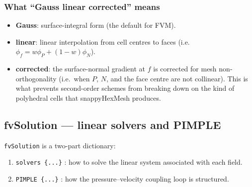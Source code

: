 \documentclass[11pt,a4paper]{article}
\begin{document}
\subsubsection{What ``Gauss linear corrected'' means}

\begin{itemize}[leftmargin=1.5em,topsep=2pt]
    \item \textbf{Gauss}: surface-integral form (the default for FVM).
    \item \textbf{linear}: linear interpolation from cell centres to
    faces (i.e.\ $\phi_f = w\phi_P + (1-w)\phi_N$).
    \item \textbf{corrected}: the surface-normal gradient at $f$ is
    corrected for mesh non-orthogonality (i.e.\ when $P$, $N$, and the
    face centre are not collinear). This is what prevents
    second-order schemes from breaking down on the kind of polyhedral
    cells that snappyHexMesh produces.
\end{itemize}

\subsection{fvSolution --- linear solvers and PIMPLE}

\texttt{fvSolution} is a two-part dictionary:

\begin{enumerate}[leftmargin=1.5em,topsep=2pt]
    \item \texttt{solvers \{...\}} : how to solve the linear system
    associated with each field.
    \item \texttt{PIMPLE \{...\}} : how the
    pressure--velocity coupling loop is structured.
\end{enumerate}
\end{document}
